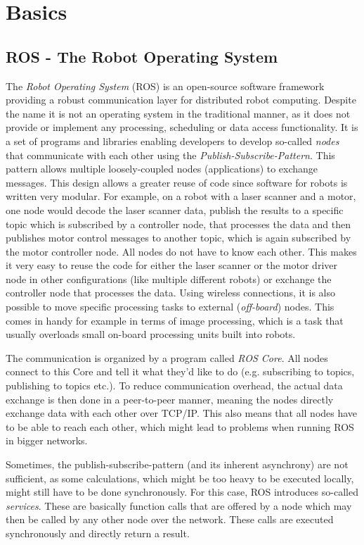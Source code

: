 \chapter{Basics}
\label{chap:basics}
\section{ROS - The Robot Operating System}

The \textit{Robot Operating System} (ROS) is an open-source software framework providing a robust communication layer for distributed robot computing\cite{ros:intro}. Despite the name it is not an operating system in the traditional manner, as it does not provide or implement any processing, scheduling or data access functionality. It is a set of programs and libraries enabling developers to develop so-called \textit{nodes} that communicate with each other using the \textit{Publish-Subscribe-Pattern}.
This pattern allows multiple loosely-coupled nodes (applications) to exchange messages. This design allows a greater reuse of code since software for robots is written very modular\cite{Eugster2003}. For example, on a robot with a laser scanner and a motor, one node would decode the laser scanner data, publish the results to a specific topic which is subscribed by a controller node, that processes the data and then publishes motor control messages to another topic, which is again subscribed by the motor controller node. All nodes do not have to know each other. This makes it very easy to reuse the code for either the laser scanner or the motor driver node in other configurations (like multiple different robots) or exchange the controller node that processes the data. Using wireless connections, it is also possible to move specific processing tasks to external (\textit{off-board}) nodes. This comes in handy for example in terms of image processing, which is a task that usually overloads small on-board processing units built into robots.

The communication is organized by a program called \textit{ROS Core}. All nodes connect to this Core and tell it what they'd like to do (e.g. subscribing to topics, publishing to topics etc.). To reduce communication overhead, the actual data exchange is then done in a peer-to-peer manner, meaning the nodes directly exchange data with each other over TCP/IP. This also means that all nodes have to be able to reach each other, which might lead to problems when running ROS in bigger networks.

Sometimes, the publish-subscribe-pattern (and its inherent asynchrony) are not sufficient, as some calculations, which might be too heavy to be executed locally, might still have to be done synchronously. For this case, ROS introduces so-called \textit{services}. These are basically function calls that are offered by a node which may then be called by any other node over the network. These calls are executed synchronously and directly return a result.

